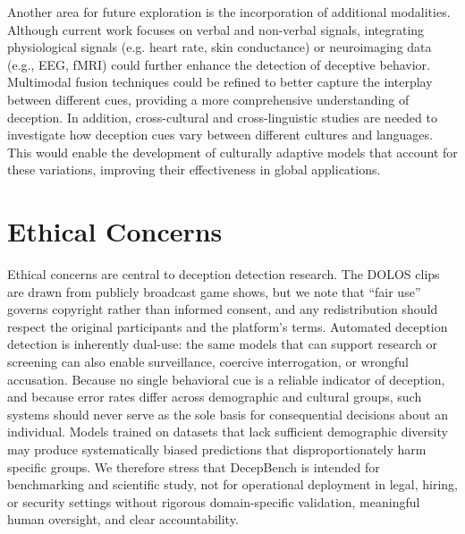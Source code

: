 \documentclass[11pt]{article}
\begin{document}
Another area for future exploration is the incorporation of additional modalities. Although current work focuses on verbal and non-verbal signals, integrating physiological signals (e.g. heart rate, skin conductance) or neuroimaging data (e.g., EEG, fMRI) could further enhance the detection of deceptive behavior. Multimodal fusion techniques could be refined to better capture the interplay between different cues, providing a more comprehensive understanding of deception. In addition, cross-cultural and cross-linguistic studies are needed to investigate how deception cues vary between different cultures and languages. This would enable the development of culturally adaptive models that account for these variations, improving their effectiveness in global applications.

\section{Ethical Concerns}
Ethical concerns are central to deception detection research. The DOLOS clips are drawn from publicly broadcast game shows, but we note that ``fair use'' governs copyright rather than informed consent, and any redistribution should respect the original participants and the platform's terms. Automated deception detection is inherently dual-use: the same models that can support research or screening can also enable surveillance, coercive interrogation, or wrongful accusation. Because no single behavioral cue is a reliable indicator of deception, and because error rates differ across demographic and cultural groups, such systems should never serve as the sole basis for consequential decisions about an individual. Models trained on datasets that lack sufficient demographic diversity may produce systematically biased predictions that disproportionately harm specific groups. We therefore stress that DecepBench is intended for benchmarking and scientific study, not for operational deployment in legal, hiring, or security settings without rigorous domain-specific validation, meaningful human oversight, and clear accountability.
\end{document}
